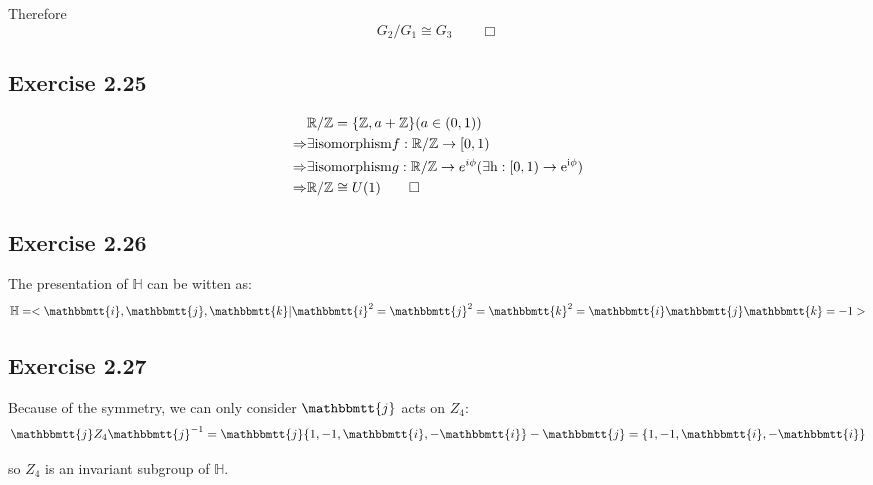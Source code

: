 \documentclass[]{ctexart}
\newcommand{\mi}{\mathbbmtt{i}}
\newcommand{\mj}{\mathbbmtt{j}}
\newcommand{\mk}{\mathbbmtt{k}}
\begin{document}
		Therefore
		\begin{equation*}
		G_2/G_1\cong G_3\qquad \Box
		\end{equation*}

     
    
    \subsection{Exercise 2.25}
    \begin{equation*}
    \begin{aligned}
    &\mathbb{R}/\mathbb{Z}=\{\mathbb{Z},a+\mathbb{Z}\}(a\in (0,1))\\
    \Rightarrow &\exists {\rm isomorphism}f:\mathbb{R}/\mathbb{Z}\rightarrow [0,1)\\
    \Rightarrow &\exists {\rm isomorphism}g:\mathbb{R}/\mathbb{Z}\rightarrow e^{i\phi}{(\rm \exists h:[0,1)\rightarrow e^{i\phi})}\\
    \Rightarrow & \mathbb{R}/\mathbb{Z}\cong U(1)\qquad \Box
    \end{aligned}
    \end{equation*}
    
    \subsection{Exercise 2.26}
    The presentation of $\mathbb{H}$ can be witten as:
    \begin{equation*}
    \mathbb{H}=<\mi,\mj,\mk|\mi^2=\mj^2=\mk^2=\mi\mj\mk=-1>
    \end{equation*}
    
    \subsection{Exercise 2.27}
		Because of the symmetry, we can only consider $\mj$ acts on $Z_4$:
		\begin{equation*}
			\mj Z_4\mj^{-1}=\mj\{1,-1,\mi,-\mi\}-\mj=\{1,-1,\mi,-\mi\}
		\end{equation*}
		
		so $Z_4$ is an invariant subgroup of $\mathbb{H}$. 
	
\end{document}
